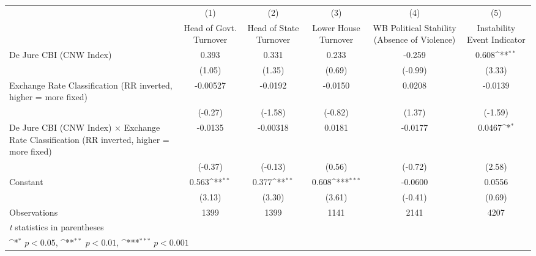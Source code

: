 {
\def\sym#1{\ifmmode^{#1}\else\(^{#1}\)\fi}
\begin{tabular}{l*{5}{c}}
\hline\hline
                &\multicolumn{1}{c}{(1)}&\multicolumn{1}{c}{(2)}&\multicolumn{1}{c}{(3)}&\multicolumn{1}{c}{(4)}&\multicolumn{1}{c}{(5)}\\
                &\multicolumn{1}{c}{Head of Govt. Turnover}&\multicolumn{1}{c}{Head of State Turnover}&\multicolumn{1}{c}{Lower House Turnover}&\multicolumn{1}{c}{WB Political Stability (Absence of Violence)}&\multicolumn{1}{c}{Instability Event Indicator}\\
\hline
De Jure CBI (CNW Index)&    0.393         &    0.331         &    0.233         &   -0.259         &    0.608\sym{**} \\
                &   (1.05)         &   (1.35)         &   (0.69)         &  (-0.99)         &   (3.33)         \\
[1em]
Exchange Rate Classification (RR inverted, higher = more fixed)& -0.00527         &  -0.0192         &  -0.0150         &   0.0208         &  -0.0139         \\
                &  (-0.27)         &  (-1.58)         &  (-0.82)         &   (1.37)         &  (-1.59)         \\
[1em]
De Jure CBI (CNW Index) $\times$ Exchange Rate Classification (RR inverted, higher = more fixed)&  -0.0135         & -0.00318         &   0.0181         &  -0.0177         &   0.0467\sym{*}  \\
                &  (-0.37)         &  (-0.13)         &   (0.56)         &  (-0.72)         &   (2.58)         \\
[1em]
Constant        &    0.563\sym{**} &    0.377\sym{**} &    0.608\sym{***}&  -0.0600         &   0.0556         \\
                &   (3.13)         &   (3.30)         &   (3.61)         &  (-0.41)         &   (0.69)         \\
\hline
Observations    &     1399         &     1399         &     1141         &     2141         &     4207         \\
\hline\hline
\multicolumn{6}{l}{\footnotesize \textit{t} statistics in parentheses}\\
\multicolumn{6}{l}{\footnotesize \sym{*} \(p<0.05\), \sym{**} \(p<0.01\), \sym{***} \(p<0.001\)}\\
\end{tabular}
}
